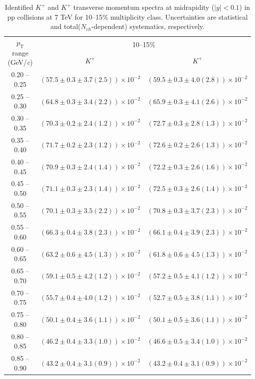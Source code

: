 \begin{table}
\caption{Identified $K^{+}$ and $K^{+}$  transverse momentum spectra at midrapidity ($|y|<0.1$) in pp collisions at 7 TeV for 10--15\% multiplicity class. Uncertainties are statistical and total($N_{ch}$-dependent) systematics, respectively.}
\label{tab:KaonPlus_KaonMinus_10to15}
\begin{center}
\begin{tabular}{ c | c c }
\hline
\multirow{2}{*}{$p_{\mathrm{T}}$ range (GeV/\textit{c})} & \multicolumn{2}{c}{10--15\%} \\ & $K^{+}$& $K^{+}$\\ 
\hline
0.20 -- 0.25 & $(57.5\pm0.3\pm3.7(2.5))\times10^{-2}$ & $(59.5\pm0.3\pm4.0(2.8))\times10^{-2}$ \\ 
0.25 -- 0.30 & $(64.8\pm0.3\pm3.4(2.2))\times10^{-2}$ & $(65.9\pm0.3\pm4.1(2.6))\times10^{-2}$ \\ 
0.30 -- 0.35 & $(70.3\pm0.2\pm2.4(1.2))\times10^{-2}$ & $(72.7\pm0.3\pm2.8(1.3))\times10^{-2}$ \\ 
0.35 -- 0.40 & $(71.7\pm0.2\pm2.3(1.2))\times10^{-2}$ & $(72.6\pm0.2\pm2.6(1.3))\times10^{-2}$ \\ 
0.40 -- 0.45 & $(70.9\pm0.3\pm2.4(1.4))\times10^{-2}$ & $(72.2\pm0.3\pm2.6(1.6))\times10^{-2}$ \\ 
0.45 -- 0.50 & $(71.1\pm0.3\pm2.3(1.4))\times10^{-2}$ & $(72.5\pm0.3\pm2.6(1.4))\times10^{-2}$ \\ 
0.50 -- 0.55 & $(70.1\pm0.3\pm3.5(2.2))\times10^{-2}$ & $(70.8\pm0.3\pm3.7(2.3))\times10^{-2}$ \\ 
0.55 -- 0.60 & $(66.3\pm0.4\pm3.8(2.3))\times10^{-2}$ & $(66.1\pm0.4\pm3.9(2.3))\times10^{-2}$ \\ 
0.60 -- 0.65 & $(63.2\pm0.6\pm4.5(1.3))\times10^{-2}$ & $(61.8\pm0.6\pm4.5(1.3))\times10^{-2}$ \\ 
0.65 -- 0.70 & $(59.1\pm0.5\pm4.2(1.2))\times10^{-2}$ & $(57.2\pm0.5\pm4.1(1.2))\times10^{-2}$ \\ 
0.70 -- 0.75 & $(55.7\pm0.4\pm4.0(1.2))\times10^{-2}$ & $(52.7\pm0.5\pm3.8(1.1))\times10^{-2}$ \\ 
0.75 -- 0.80 & $(50.1\pm0.4\pm3.6(1.1))\times10^{-2}$ & $(50.1\pm0.5\pm3.6(1.1))\times10^{-2}$ \\ 
0.80 -- 0.85 & $(46.2\pm0.4\pm3.3(1.0))\times10^{-2}$ & $(46.6\pm0.5\pm3.4(1.0))\times10^{-2}$ \\ 
0.85 -- 0.90 & $(43.2\pm0.4\pm3.1(0.9))\times10^{-2}$ & $(43.2\pm0.4\pm3.1(0.9))\times10^{-2}$ \\ 

\end{tabular}
\end{center}
\end{table}
